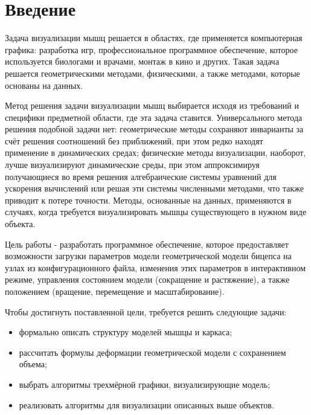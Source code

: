 \chapter*{Введение}

Задача визуализации мышц решается в областях, где применяется компьютерная графика: разработка игр, профессиональное программное обеспечение, которое используется биологами и врачами, монтаж в кино и других. Такая задача решается геометрическими методами, физическими, а также методами, которые основаны на данных\cite{cgv}.

Метод решения задачи визуализации мышц выбирается исходя из требований и специфики предметной области, где эта задача ставится. Универсального метода решения подобной задачи нет: геометрические методы сохраняют инварианты за счёт решения соотношений без приближений, при этом редко находят применение в динамических средах; физические методы визуализации, наоборот, лучше визуализируют динамические среды, при этом аппроксимируя получающиеся во время решения алгебраические системы уравнений для ускорения вычислений или решая эти системы численными методами, что также приводит к потере точности. Методы, основанные на данных, применяются в случаях, когда требуется визуализировать мышцы существующего в нужном виде объекта.

Цель работы - разработать программное обеспечение, которое предоставляет возможности загрузки параметров модели геометрической модели бицепса на узлах из конфигурационного файла, изменения этих параметров в интерактивном режиме, управления состоянием модели (сокращение и растяжение), а также положением (вращение, перемещение и масштабирование).

Чтобы достигнуть поставленной цели, требуется решить следующие задачи:
\begin{itemize}
    \item формально описать структуру моделей мышцы и каркаса;
    \item рассчитать формулы деформации геометрической модели с сохранением объема;
    \item выбрать алгоритмы трехмёрной графики, визуализирующие модель;
    \item реализовать алгоритмы для визуализации описанных выше объектов.
\end{itemize}
